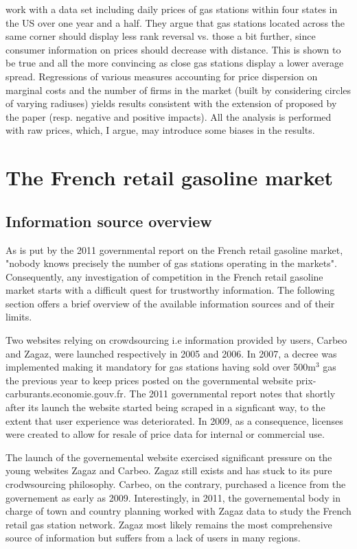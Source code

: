 \documentclass[11pt]{article}
\begin{document}
\cite{TAP11} work with a data set including daily prices of gas stations within four states in the US over one year and a half. They argue that gas stations located across the same corner should display less rank reversal vs. those a bit further, since consumer information on prices should decrease with distance. This is shown to be true and all the more convincing as close gas stations display a lower average spread. Regressions of various measures accounting for price dispersion on marginal costs and the number of firms in the market (built by considering circles of varying radiuses) yields results consistent with the extension of \cite{VAR80} proposed by the paper (resp. negative and positive impacts). All the analysis is performed with raw prices, which, I argue, may introduce some biases in the results.

\section{The French retail gasoline market}

\subsection{Information source overview}

As is put by the 2011 governmental report on the French retail gasoline market, "nobody knows precisely the number of gas stations operating in the markets". Consequently, any investigation of competition in the French retail gasoline market starts with a difficult quest for trustworthy information. The following section offers a brief overview of the available information sources and of their limits.

Two websites relying on crowdsourcing i.e information provided by users, Carbeo and Zagaz, were launched respectively in 2005 and 2006. In 2007, a decree was implemented making it mandatory for gas stations having sold over 500m$^{3}$ gas the previous year to keep prices posted on the governmental website prix-carburants.economie.gouv.fr. The 2011 governmental report notes that shortly after its launch the website started being scraped in a signficant way, to the extent that user experience was deteriorated. In 2009, as a consequence, licenses were created to allow for resale of price data for internal or commercial use.

The launch of the governemental website exercised significant pressure on the young websites Zagaz and Carbeo. Zagaz still exists and has stuck to its pure crodwsourcing philosophy. Carbeo, on the contrary, purchased a licence from the governement as early as 2009. Interestingly, in 2011, the governemental body in charge of town and country planning worked with Zagaz data to study the French retail gas station network. Zagaz most likely remains the most comprehensive source of information but suffers from a lack of users in many regions.
\end{document}
